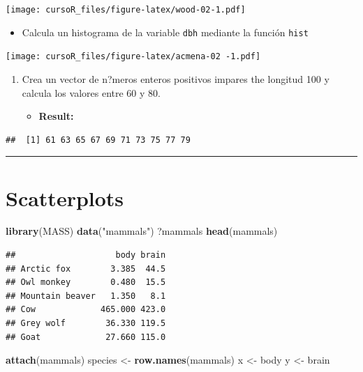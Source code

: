 \documentclass[]{book}
\newenvironment{Shaded}{\begin{snugshade}}{\end{snugshade}}
\newcommand{\KeywordTok}[1]{\textcolor[rgb]{0.13,0.29,0.53}{\textbf{#1}}}
\newcommand{\StringTok}[1]{\textcolor[rgb]{0.31,0.60,0.02}{#1}}
\newcommand{\NormalTok}[1]{#1}
\providecommand{\tightlist}{%
  \setlength{\itemsep}{0pt}\setlength{\parskip}{0pt}}
\begin{document}
\texttt{[image: cursoR\_files/figure-latex/wood-02-1.pdf]}

\begin{itemize}
\tightlist
\item
  Calcula un histograma de la variable \texttt{dbh} mediante la función
  \texttt{hist}
\end{itemize}

\texttt{[image: cursoR\_files/figure-latex/acmena-02 -1.pdf]}

\begin{enumerate}
\def\labelenumi{\arabic{enumi}.}
\setcounter{enumi}{3}
\item
  Crea un vector de n?meros enteros positivos impares the longitud 100 y
  calcula los valores entre 60 y 80.

  \begin{itemize}
  \tightlist
  \item
    \textbf{Result:}
  \end{itemize}
\end{enumerate}

\begin{verbatim}
##  [1] 61 63 65 67 69 71 73 75 77 79
\end{verbatim}

\begin{center}\rule{0.5\linewidth}{\linethickness}\end{center}

\section{Scatterplots}\label{scatterplots}

\begin{Shaded}
\begin{Highlighting}[]
\KeywordTok{library}\NormalTok{(MASS)}
\KeywordTok{data}\NormalTok{(}\StringTok{"mammals"}\NormalTok{)}
\NormalTok{?mammals}
\KeywordTok{head}\NormalTok{(mammals)}
\end{Highlighting}
\end{Shaded}

\begin{verbatim}
##                    body brain
## Arctic fox        3.385  44.5
## Owl monkey        0.480  15.5
## Mountain beaver   1.350   8.1
## Cow             465.000 423.0
## Grey wolf        36.330 119.5
## Goat             27.660 115.0
\end{verbatim}

\begin{Shaded}
\begin{Highlighting}[]
\KeywordTok{attach}\NormalTok{(mammals)}
\NormalTok{species <-}\StringTok{ }\KeywordTok{row.names}\NormalTok{(mammals)}
\NormalTok{x <-}\StringTok{ }\NormalTok{body}
\NormalTok{y <-}\StringTok{ }\NormalTok{brain}
\end{Highlighting}
\end{Shaded}
\end{document}
